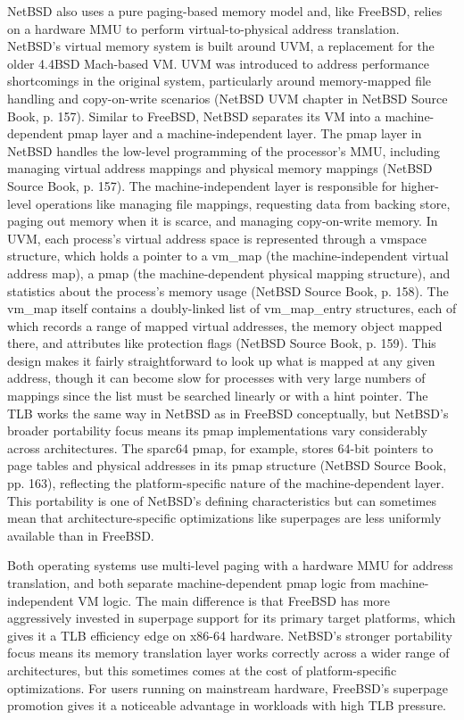 NetBSD also uses a pure paging-based memory model and, like FreeBSD, relies on a hardware MMU to perform virtual-to-physical address translation. NetBSD's virtual memory system is built around UVM, a replacement for the older 4.4BSD Mach-based VM. UVM was introduced to address performance shortcomings in the original system, particularly around memory-mapped file handling and copy-on-write scenarios (NetBSD UVM chapter in NetBSD Source Book, p. 157).
Similar to FreeBSD, NetBSD separates its VM into a machine-dependent pmap layer and a machine-independent layer. The pmap layer in NetBSD handles the low-level programming of the processor's MMU, including managing virtual address mappings and physical memory mappings (NetBSD Source Book, p. 157). The machine-independent layer is responsible for higher-level operations like managing file mappings, requesting data from backing store, paging out memory when it is scarce, and managing copy-on-write memory.
In UVM, each process's virtual address space is represented through a vmspace structure, which holds a pointer to a vm\_map (the machine-independent virtual address map), a pmap (the machine-dependent physical mapping structure), and statistics about the process's memory usage (NetBSD Source Book, p. 158). The vm\_map itself contains a doubly-linked list of vm\_map\_entry structures, each of which records a range of mapped virtual addresses, the memory object mapped there, and attributes like protection flags (NetBSD Source Book, p. 159). This design makes it fairly straightforward to look up what is mapped at any given address, though it can become slow for processes with very large numbers of mappings since the list must be searched linearly or with a hint pointer.
The TLB works the same way in NetBSD as in FreeBSD conceptually, but NetBSD's broader portability focus means its pmap implementations vary considerably across architectures. The sparc64 pmap, for example, stores 64-bit pointers to page tables and physical addresses in its pmap structure (NetBSD Source Book, pp. 163), reflecting the platform-specific nature of the machine-dependent layer. This portability is one of NetBSD's defining characteristics but can sometimes mean that architecture-specific optimizations like superpages are less uniformly available than in FreeBSD.

Both operating systems use multi-level paging with a hardware MMU for address translation, and both separate machine-dependent pmap logic from machine-independent VM logic. The main difference is that FreeBSD has more aggressively invested in superpage support for its primary target platforms, which gives it a TLB efficiency edge on x86-64 hardware. NetBSD's stronger portability focus means its memory translation layer works correctly across a wider range of architectures, but this sometimes comes at the cost of platform-specific optimizations. For users running on mainstream hardware, FreeBSD's superpage promotion gives it a noticeable advantage in workloads with high TLB pressure.

